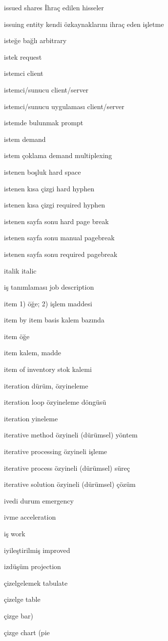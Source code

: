 \documentclass[12pt,fleqn]{article}\usepackage{../../common}
\begin{document}
issued shares İhraç edilen hisseler

issuing entity kendi özkaynaklarını ihraç eden işletme

isteğe bağlı arbitrary

istek request

istemci client

istemci/sunucu client/server

istemci/sunucu uygulaması client/server

istemde bulunmak prompt

istem demand

istem çoklama demand multiplexing

istenen boşluk hard space

istenen kısa çizgi hard hyphen

istenen kısa çizgi required hyphen

istenen sayfa sonu hard page break

istenen sayfa sonu manual pagebreak

istenen sayfa sonu required pagebreak

italik italic

iş tanımlaması job description

item 1) öğe; 2) işlem maddesi

item by item basis kalem bazında

item öğe

item kalem, madde

item of inventory stok kalemi

iteration dürüm, özyineleme

iteration loop özyineleme döngüsü

iteration yineleme

iterative method özyineli (dürümsel) yöntem

iterative processing özyineli işleme

iterative process özyineli (dürümsel) süreç

iterative solution özyineli (dürümsel) çözüm

ivedi durum emergency

ivme acceleration

iş work

iyileştirilmiş improved

izdüşüm projection

çizelgelemek tabulate

çizelge table

çizge bar)

çizge chart (pie
\end{document}
